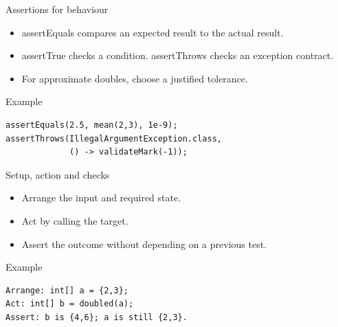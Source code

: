 \documentclass[10pt,aspectratio=169]{beamer}
\begin{document}
\begin{frame}[fragile,t]{Assertions for behaviour}
\begin{itemize}
\item assertEquals compares an expected result to the actual result.
\item assertTrue checks a condition. assertThrows checks an exception contract.
\item For approximate doubles, choose a justified tolerance.
\end{itemize}
\vspace{1mm}\begin{block}{Example}
\begin{lstlisting}
assertEquals(2.5, mean(2,3), 1e-9);
assertThrows(IllegalArgumentException.class,
             () -> validateMark(-1));
\end{lstlisting}
\end{block}
\end{frame}

\begin{frame}[fragile,t]{Setup, action and checks}
\begin{itemize}
\item Arrange the input and required state.
\item Act by calling the target.
\item Assert the outcome without depending on a previous test.
\end{itemize}
\vspace{1mm}\begin{block}{Example}
\begin{lstlisting}
Arrange: int[] a = {2,3};
Act: int[] b = doubled(a);
Assert: b is {4,6}; a is still {2,3}.
\end{lstlisting}
\end{block}
\end{frame}
\end{document}
